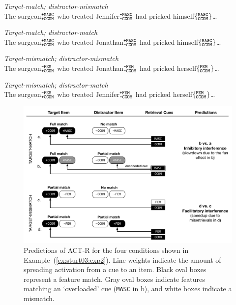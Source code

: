 \documentclass{cambridge7A}\usepackage[]{graphicx}\usepackage[]{color}
\newcommand{\actrcue}[1]{\texttt{\uppercase{#1}}}
\newcommand{\featureset}[2]{$\{^{\texttt{\uppercase{#1}}}_{\texttt{\uppercase{#2}}}\}$}
\newcommand{\featuresetNP}[2]{$^{\texttt{\uppercase{#1}}}_{\texttt{\uppercase{#2}}}$}
\begin{document}
\begin{exe}
\ex\label{ex:sturt03:exp2}
\begin{xlist}
\item \textit{Target-match; distractor-mismatch}\\
The surgeon\featuresetNP{+MASC}{+CCOM} who treated Jennifer\featuresetNP{-MASC}{-CCOM} had pricked himself\featureset{MASC}{CCOM}\dots
\item \textit{Target-match; distractor-match}\\
The surgeon\featuresetNP{+MASC}{+CCOM} who treated Jonathan\featuresetNP{+MASC}{-CCOM} had pricked himself\featureset{MASC}{CCOM}\dots
\item \textit{Target-mismatch; distractor-mismatch}\\
The surgeon\featuresetNP{-FEM}{+CCOM} who treated Jonathan\featuresetNP{-FEM}{-CCOM} had pricked herself\featureset{FEM}{CCOM}\dots
\item \textit{Target-mismatch; distractor-match}\\
The surgeon\featuresetNP{-FEM}{+CCOM} who treated Jennifer\featuresetNP{+FEM}{-CCOM} had pricked herself\featureset{FEM}{CCOM}\dots
\end{xlist}
\end{exe}


\begin{figure}[!htbp]
\includegraphics[width=\textwidth]{figures/tableLV05pred}
    \caption{Predictions of ACT-R for the four conditions shown in Example~(\ref{ex:sturt03:exp2}). Line weights indicate the amount of spreading activation from a cue to an item. Black oval boxes represent a feature match. Gray oval boxes indicate features matching an `overloaded' cue (\actrcue{MASC} in b), and white boxes indicate a mismatch.} \label{fig:ACTRpred}
\end{figure}
\end{document}
